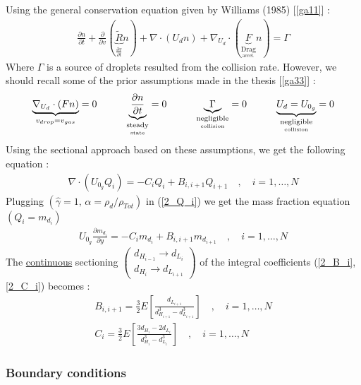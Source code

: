 \documentclass[12pt]{article}
\newcommand\tab[1][1cm]{\hspace*{#1}}
\numberwithin{equation}{section}
\begin{document}
\begin{flushleft}
Using the general conservation equation given by Williams (1985) [\ref{ga11}] :
\begin{align} 
\frac{ \partial n}{ \partial t} + \frac{ \partial}{ \partial v} ( \underbrace{\tilde{R}}_{ \frac{\partial v}{\partial t}} n ) + \nabla \cdot ( U_d n ) + \nabla_{U_d} \cdot ( \underbrace{F}_{  \underset{ \text{accel.}}{\text{Drag}}} n ) = \Gamma
\end{align} 
Where $\Gamma$ is a source of droplets resulted from the collision rate. However, we should recall some of the prior assumptions made in the thesis [\ref{ga33}] :
\begin{align}
\underbrace{\nabla_{U_{d}} \cdot(F n)}_{v_{d r o p}=v_{g a s}}=0 \tab \underbrace{\frac{\partial n}{\partial t}}_{ \underset{\text {state}}{\text{steady}} }=0 \tab \underbrace{\Gamma}_{ \underset{\text {collision}}{\text{negligible}} }=0 \tab \underbrace{U_{d}=U_{0_{g}}}_{\underset{\text {collision}}{\text{negligible}} }=0
\end{align}  
Using the sectional approach based on these assumptions, we get the following equation :
\begin{align}
\nabla \cdot\left(U_{0_{g}} Q_{i}\right)=-C_{i} Q_{i}+B_{i, i+1} Q_{i+1} \quad, \quad i=1, \dots, N
\end{align}
Plugging $\left(\hat{\gamma}=1, \, \alpha=\rho_{d} / \rho_{T o t}\right)$ in (\ref{2_Q_i}) we get the mass fraction equation $\left(Q_{i}=m_{d_{i}}\right)$
\begin{align}
U_{0_{g}} \frac{\partial m_{d_{i}}}{\partial y}=-C_{i} m_{d_{i}}+B_{i, i+1} m_{d_{i+1}} \quad, \quad i=1, \ldots, N
\end{align}
The \underline{continuous} sectioning $\left(\begin{array}{c}d_{H_{i-1}} \rightarrow d_{L_{i}} \\ d_{H_{i}} \rightarrow d_{L_{i+1}}\end{array}\right)$ of the integral coefficients (\ref{2_B_i}, \ref{2_C_i}) becomes :
\begin{align}
B_{i, i+1}= \frac{3}{2} E\left[\frac{d_{L_{i+1}}}{d_{H_{i+1}}^{3}-d_{L_{i+1}}^{3}}\right]  \quad , \quad i=1, \ldots, N \\
C_{i} =\frac{3}{2} E\left[\frac{3 d_{H_{i}}-2 d_{L_{i}}}{d_{H_{i}}^{3}-d_{L_{i}}^{3}}\right] \quad, \quad i=1, \ldots, N 
\end{align}

\newpage

\subsubsection{Boundary conditions}


\end{flushleft}
\end{document}
